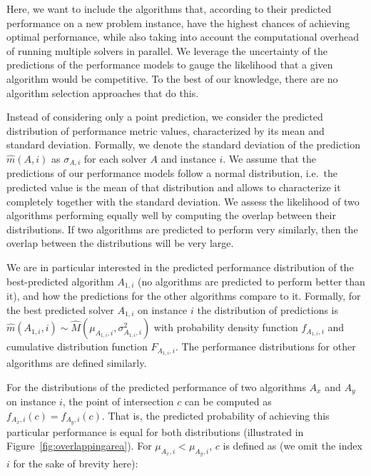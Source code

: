 Here, we want to include the algorithms that, according to their predicted performance on a new problem instance, have the highest chances of achieving optimal performance, while also taking into account the computational overhead of running multiple solvers in parallel. We leverage the uncertainty of the predictions of the performance models to gauge the likelihood that a given algorithm would be competitive. To the best of our knowledge, there are no algorithm selection approaches that do this.

Instead of considering only a point prediction, we consider the predicted distribution of performance metric values, characterized by its mean and standard deviation. Formally, we denote the standard deviation of the prediction \begin{math}\hat{m}(A, i)\end{math} as \begin{math}\sigma_{A, i}\end{math} for each solver $A$ and instance $i$.
We assume that the predictions of our performance models follow a normal distribution, i.e.\ the predicted value is the mean of that distribution and allows to characterize it completely together with the standard deviation. We assess the likelihood of two algorithms performing equally well by computing the overlap between their distributions. If two algorithms are predicted to perform very similarly, then the overlap between the distributions will be very large.

We are in particular interested in the predicted performance distribution of the best-predicted algorithm $A_{1,i}$ (no algorithms are predicted to perform better than it), and how the predictions for the other algorithms compare to it.
Formally, for the best predicted solver $A_{1,i}$ on instance $i$ the distribution of predictions is \begin{math} \hat{m}(A_{1,i}, i) \sim \hat{M}(\mu_{A_{1,i},i}, \sigma^2_{A_{1,i},i}) \end{math} with probability density function \begin{math} f_{A_{1,i},i}\end{math} and cumulative distribution function \begin{math} F_{A_{1,i},i}\end{math}. The performance distributions for other algorithms are defined similarly.

For the distributions of the predicted performance of two algorithms $A_x$ and $A_y$ on instance $i$, the point of intersection $c$ can be computed as \begin{math} f_{A_x,i}(c) =  f_{A_y,i}(c) \end{math}. That is, the predicted probability of achieving this particular performance is equal for both distributions (illustrated in Figure~\ref{fig:overlappingarea}).
For \begin{math}
    \mu_{A_x,i} < \mu_{A_y,i}
\end{math}, $c$ is defined as (we omit the index $i$ for the sake of brevity here):

